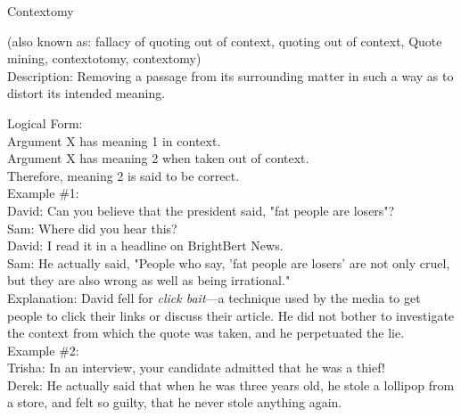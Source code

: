 \documentclass[a4paper,12pt,single,pdftex]{scrartcl}
\begin{document}
Contextomy
    
      (also known as: fallacy of quoting out of context, quoting out of context, Quote mining, contextotomy, contextomy)
    \\

  
    Description: Removing a passage from its surrounding matter in such a way as to distort its intended meaning.

    
      Logical Form:
    \\

    
      Argument X has meaning 1 in context.
    \\

    
      Argument X has meaning 2 when taken out of context.
    \\

    
      Therefore, meaning 2 is said to be correct.
    \\

    
      Example \#1:
    \\

    
      David: Can you believe that the president said, "fat people are losers"?
    \\

    
      Sam: Where did you hear this?
    \\

    
      David: I read it in a headline on BrightBert News.
    \\

    
      Sam: He actually said, "People who say, 'fat people are losers' are not only cruel, but they are also wrong as well as being irrational."
    \\

    
      Explanation: David fell for {\it click bait}—a technique used by the media to get people to click their links or discuss their article. He did not bother to investigate the context from which the quote was taken, and he perpetuated the lie.
    \\

    
      Example \#2:
    \\

    
      Trisha: In an interview, your candidate admitted that he was a thief!
    \\

    
      Derek: He actually said that when he was three years old, he stole a lollipop from a store, and felt so guilty, that he never stole anything again.
    \\
\end{document}
